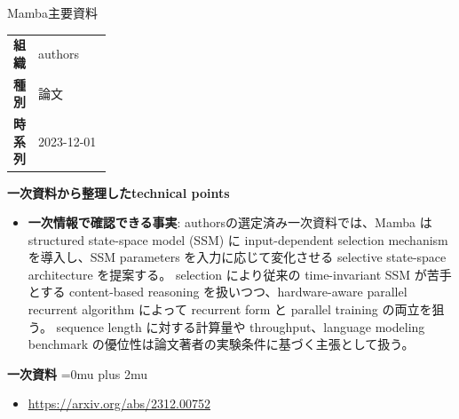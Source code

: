 \begin{technicalnote}{Mamba}{主要資料}
\begingroup
\begin{tabularx}{\linewidth}{@{}>{\bfseries}p{0.22\linewidth}X@{}}
組織 & authors \\
種別 & 論文 \\
時系列 & 2023-12-01 \\
\end{tabularx}
\smallskip
{\bfseries 一次資料から整理したtechnical points}
\begin{itemize}[leftmargin=1.5em,itemsep=0.35em]
\item \textbf{一次情報で確認できる事実}: authorsの選定済み一次資料では、Mamba は structured state-space model (SSM) に input-dependent selection mechanism を導入し、SSM parameters を入力に応じて変化させる selective state-space architecture を提案する。 selection により従来の time-invariant SSM が苦手とする content-based reasoning を扱いつつ、hardware-aware parallel recurrent algorithm によって recurrent form と parallel training の両立を狙う。 sequence length に対する計算量や throughput、language modeling benchmark の優位性は論文著者の実験条件に基づく主張として扱う。
\end{itemize}
\begin{minipage}{\linewidth}
\begin{samepage}
{\bfseries 一次資料}
\begingroup\sloppy
\Urlmuskip=0mu plus 2mu\relax
\begin{itemize}[leftmargin=1.5em,itemsep=0.25em]
\item {\scriptsize\url{https://arxiv.org/abs/2312.00752}}
\end{itemize}
\endgroup
\end{samepage}
\end{minipage}
\endgroup
\end{technicalnote}
\medskip
